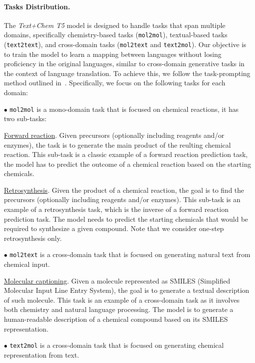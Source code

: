 \documentclass[nohyperref]{article}
\theoremstyle{plain}
\theoremstyle{definition}
\theoremstyle{remark}
\begin{document}
\paragraph{Tasks Distribution.}
The \emph{Text+Chem T5}  model is designed to handle tasks that span multiple domains, specifically chemistry-based tasks (\texttt{mol2mol}), textual-based tasks (\texttt{text2text}), and cross-domain tasks (\texttt{mol2text} and \texttt{text2mol}).
Our objective is to train the model to learn a mapping between languages without losing proficiency in the original languages, similar to cross-domain generative tasks in the context of language translation.
To achieve this, we follow the task-prompting method outlined in~\citet{raffel2020exploring}. Specifically, we focus on the following tasks for each domain:

$\bullet$ \texttt{mol2mol} is a mono-domain task that is focused on chemical reactions, it has two sub-tasks:

\underline{Forward reaction}. Given precursors (optionally including reagents and/or enzymes), the task is to generate the main product of the reulting chemical reaction. This sub-task is a classic example of a forward reaction prediction task, the model has to predict the outcome of a chemical reaction based on the starting chemicals.

\underline{Retrosynthesis}. Given the product of a chemical reaction, the goal is to find the precursors (optionally including reagents and/or enzymes). This sub-task is an example of a retrosynthesis task, which is the inverse of a forward reaction prediction task. The model needs to predict the starting chemicals that would be required to synthesize a given compound.
Note that we consider one-step retrosynthesis only.

$\bullet$ \texttt{mol2text} is a cross-domain task that is focused on generating natural text from chemical input.

\underline{Molecular captioning}. Given a molecule represented as SMILES (Simplified Molecular Input Line Entry System), the goal is to generate a textual description of such molecule. This task is an example of a cross-domain task as it involves both chemistry and natural language processing. The model is to generate a human-readable description of a chemical compound based on its SMILES representation.

$\bullet$ \texttt{text2mol} is a cross-domain task that is focused on generating chemical representation from text.
\end{document}
